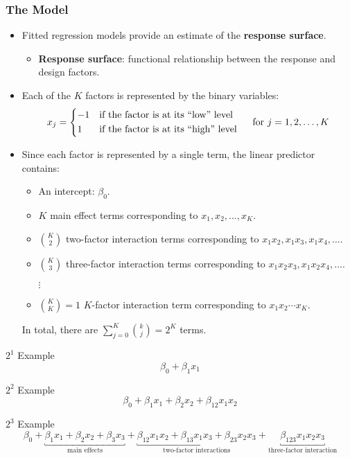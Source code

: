 \subsubsection*{The Model}
\begin{itemize}
    \item Fitted regression models provide an estimate of the \textbf{response surface}.
          \begin{itemize}[$\hookrightarrow$]
              \item \textbf{Response surface}: functional relationship between the response and design factors.
          \end{itemize}
    \item Each of the $K$ factors is represented by the binary variables:
          \[ x_j=\begin{cases*}
                  -1 & if the factor is at its ``low'' level  \\
                  1  & if the factor is at its ``high'' level
              \end{cases*}\quad \text{for }j=1,2,\ldots,K \]
    \item Since each factor is represented by a single term, the linear predictor contains:
          \begin{itemize}
              \item An intercept: $ \beta_0 $.
              \item $ K $ main effect terms corresponding to $ x_1,x_2,\ldots,x_K $.
              \item $ \binom{K}{2} $ two-factor interaction terms corresponding to $ x_1x_2,x_1x_3,x_1x_4,\ldots $.
              \item $ \binom{K}{3} $ three-factor interaction terms corresponding to $ x_1x_2x_3,x_1x_2x_4,\ldots $.
              \item[$\vdots$]
              \item $ \binom{K}{K}=1 $ $ K $-factor interaction term corresponding to $ x_1x_2\cdots x_K $.
          \end{itemize}
          In total, there are $ \sum_{j=0}^{K} \binom{k}{j}=2^K $ terms.
\end{itemize}
\begin{Example}{$ 2^1 $ Example}{}
    \[ \beta_0+\beta_1x_1 \]
\end{Example}
\begin{Example}{$ 2^2 $ Example}{}
    \[ \beta_0+\beta_1x_1+\beta_2x_2+\beta_{12}x_1x_2 \]
\end{Example}
\begin{Example}{$ 2^3 $ Example}{}
    \[ \beta_0+\underbracket{\beta_1x_1+\beta_2x_2+\beta_3x_3}_{\text{main effects}}+
        \underbracket{\beta_{12}x_1x_2+\beta_{13}x_1x_3+\beta_{23}x_2x_3}_{\text{two-factor interactions}}+
        \underbracket{\beta_{123}x_1x_2x_3}_{\text{three-factor interaction}} \]
\end{Example}
